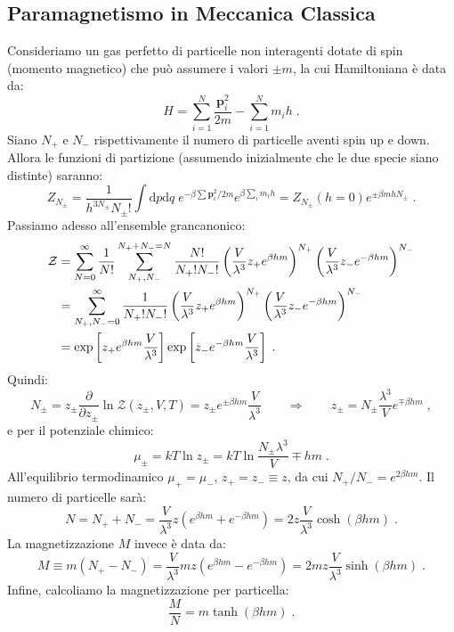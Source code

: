 \documentclass[10pt,a4paper]{report}
\theoremstyle{definition}
\numberwithin{equation}{section}
\newcommand{\diff}[1][]{\mathrm{d}#1}
\newcommand{\zpart}{\mathcal{Z}}
\begin{document}
\subsection{Paramagnetismo in Meccanica Classica}
Consideriamo un gas perfetto di particelle non interagenti dotate di spin (momento magnetico) che può assumere i valori $\pm m$, la cui Hamiltoniana è data da:
\begin{equation}
H=\sum_{i=1}^N \frac{\mathbf{p}_i^2}{2m}-\sum_{i=1}^N m_ih\;.
\end{equation}
Siano $N_+$ e $N_-$ rispettivamente il numero di particelle aventi spin up e down. Allora le funzioni di partizione (assumendo inizialmente che le due specie siano distinte) saranno:
\begin{equation}
Z_{N_{\pm}}=\frac{1}{h^{3N_{\pm}}N_{\pm}!}\int\diff{p}\diff{q}\; e^{-\beta\sum\mathbf{p}_i^2/2m}e^{\beta\sum_im_ih}=Z_{N_{\pm}}(h=0)e^{\pm\beta mhN_{\pm}}\;.
\end{equation}
Passiamo adesso all'ensemble grancanonico:
\begin{align}
\zpart&= \sum_{N=0}^{\infty}\frac{1}{N!}\sum_{N_+,N_-}^{N_++N_-=N}\frac{N!}{N_+!N_-!}\left(\frac{V}{\lambda^3}z_+e^{\beta hm}\right)^{N_+}\left(\frac{V}{\lambda^3}z_-e^{-\beta hm}\right)^{N_-} \notag \\
&=\sum_{N_+,N_-=0}^{\infty}\frac{1}{N_+!N_-!}\left(\frac{V}{\lambda^3}z_+e^{\beta hm}\right)^{N_+}\left(\frac{V}{\lambda^3}z_-e^{-\beta hm}\right)^{N_-} \notag \\
&= \exp\left[z_+e^{\beta hm}\frac{V}{\lambda^3}\right]\exp\left[z_-e^{-\beta hm}\frac{V}{\lambda^3}\right]\;.
\end{align}
Quindi:
\begin{equation}
N_{\pm}=z_{\pm}\frac{\partial}{\partial z_{\pm}}\ln\zpart(z_{\pm},V,T)=z_{\pm}e^{\pm\beta hm}\frac{V}{\lambda^3}\qquad \Longrightarrow \qquad z_{\pm}=N_{\pm}\frac{\lambda^3}{V}e^{\mp \beta hm}\;,
\end{equation}
e per il potenziale chimico:
\begin{equation}
\mu_{\pm}=kT\ln z_{\pm}=kT\ln\frac{N_{\pm}\lambda^3}{V}\mp hm\;.
\end{equation}
All'equilibrio termodinamico $\mu_+=\mu_-$, $z_+=z_-\equiv z$, da cui $N_+/N_-=e^{2\beta hm}$. Il numero di particelle sarà:
\begin{equation}
N=N_++N_-=\frac{V}{\lambda^3}z(e^{\beta hm}+e^{-\beta hm})=2z\frac{V}{\lambda^3}\cosh(\beta hm)\;.
\end{equation}
La magnetizzazione $M$ invece è data da:
\begin{equation}
M\equiv m(N_+-N_-)=\frac{V}{\lambda^3}mz(e^{\beta hm}-e^{-\beta hm})=2mz\frac{V}{\lambda^3}\sinh(\beta hm)\;.
\end{equation}
Infine, calcoliamo la magnetizzazione per particella:
\begin{equation}
\frac{M}{N}=m\tanh(\beta hm)\;.
\end{equation}
\end{document}
